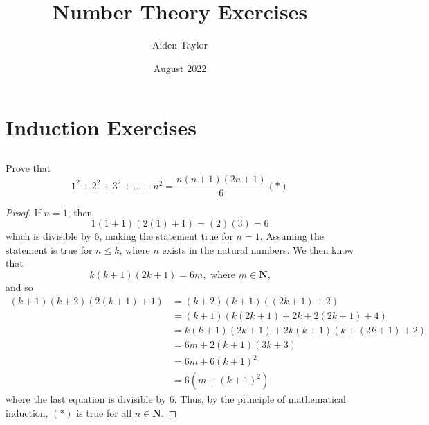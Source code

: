 \documentclass{article}
\title{Number Theory Exercises}
\author{Aiden Taylor}
\date{August 2022}
\begin{document}
\maketitle

\section{Induction Exercises}
\subsection{}
Prove that
\[
	1^2 + 2^2 + 3^2 + ... + n^2 = \frac{n(n+1)(2n+1)}{6} (*)
\]
\begin{proof}
	If $n=1$, then
	\[
		1(1+1)(2(1)+1) = (2)(3) = 6
	\]
	which is divisible by 6, making the statement true for $n=1$.
	\newline\newline
	Assuming the statement is true for $n \leq k$, where $n$ exists in the natural numbers. We then know that
	\[
		k(k+1)(2k+1) = 6m, \textrm{ where $m \in \mathbf{N}$,}
	\]
	and so
	\begin{align*}
		(k+1)(k+2)(2(k+1)+1) & = (k+2)(k+1)((2k+1)+2)\\
				     & = (k+1)(k(2k+1)+2k+2(2k+1)+4) \\
				     & = k(k+1)(2k+1)+2k(k+1)(k+(2k+1)+2) \\
				     & = 6m + 2(k+1)(3k+3) \\
				     & = 6m + 6(k+1)^2 \\
				     & = 6(m + (k+1)^2)
	\end{align*} 
where the last equation is divisible by 6. Thus, by the principle of mathematical induction, $(*)$ is true for all $n \in \mathbf{N}$.
\end{proof}
\end{document}

